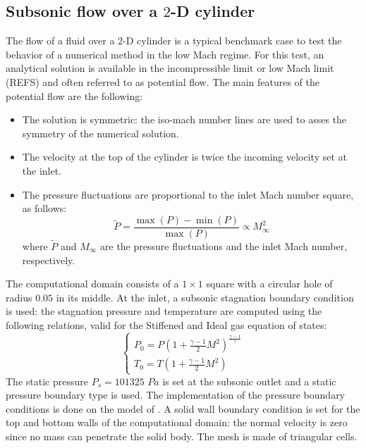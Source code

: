 \documentclass[preprint,10pt]{elsarticle}
\begin{document}
\subsection{Subsonic flow over a $2$-D cylinder} \label{sec:cylinder}
The flow of a fluid over a $2$-D cylinder is a typical benchmark case to test the behavior of a numerical method in the low Mach regime. For this test, an analytical solution is available in the incompressible limit or low Mach limit (REFS) and often referred to as potential flow. The main features of the potential flow are the following:
\begin{itemize}
\item The solution is symmetric: the iso-mach number lines are used to asses the symmetry of the numerical solution.
\item The velocity at the top of the cylinder is twice the incoming velocity set at the inlet.
\item The pressure fluctuations are proportional to the inlet Mach number square, as follows: 
\begin{equation}
\tilde{P} = \frac{\max(P) - \min(P)}{\max(P)}  \propto M_{\infty}^2\nonumber
\end{equation}
where $\tilde{P}$ and $M_{\infty}$ are the pressure fluctuations and the inlet Mach number, respectively.
\end{itemize}
The computational domain consists of a $1\times 1$ square with a circular hole of radius $0.05$ in its middle. At the inlet, a subsonic stagnation boundary condition is used: the stagnation pressure and temperature are computed using the following relations, valid for the Stiffened and Ideal gas equation of states:
\begin{equation}
\label{eq:stagnation_relations}
\left\{
\begin{array}{l}
P_0 = P\left( 1 + \frac{\gamma-1}{2} M^2 \right)^{\frac{\gamma-1}{\gamma}} \\
T_0 = T\left( 1 + \frac{\gamma-1}{2} M^2 \right)
\end{array}
\right.
\end{equation}
The static pressure $P_s = 101325$ $Pa$ is set at the subsonic outlet and a static pressure boundary type is used. The implementation of the pressure boundary conditions is done on the model of \cite{SEM}. A solid wall boundary condition is set for the top and bottom walls of the computational domain: the normal velocity is zero since no mass can penetrate the solid body. The mesh is made of triangular cells.\\
\end{document}
